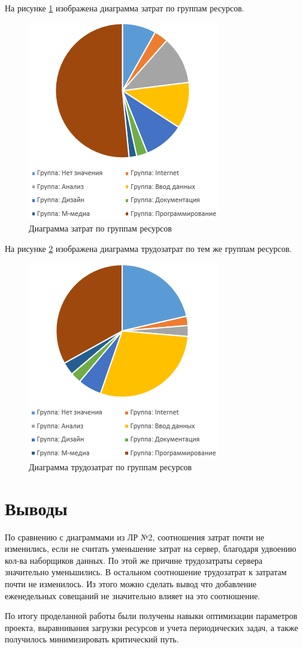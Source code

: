 На рисунке \ref{d1} изображена диаграмма затрат по группам ресурсов.
\begin{figure}[!h]
	\centering
	\includegraphics[width=0.6\linewidth]{inc/img/d1.png}
	\caption{Диаграмма затрат по группам ресурсов}
	\label{d1}
\end{figure}

\newpage
На рисунке \ref{d2} изображена диаграмма трудозатрат по тем же группам ресурсов.
\begin{figure}[!h]
	\centering
	\includegraphics[width=0.6\linewidth]{inc/img/d2.png}
	\caption{Диаграмма трудозатрат по группам ресурсов}
	\label{d2}
\end{figure}

\section*{Выводы}
По сравнению с диаграммами из ЛР №2, соотношения затрат почти не изменились, если не считать уменьшение затрат на сервер, благодаря удвоению кол-ва наборщиков данных. По этой же причине трудозатраты сервера значительно уменьшились. В остальном соотношение трудозатрат к затратам почти не изменилось. Из этого можно сделать вывод что добавление еженедельных совещаний не значительно влияет на это соотношение.

По итогу проделанной работы были получены навыки оптимизации параметров проекта, выравнивания загрузки ресурсов и учета периодических задач, а также получилось минимизировать критический путь.
